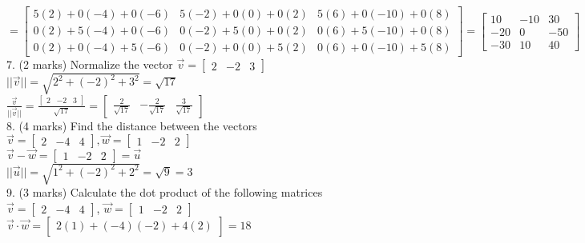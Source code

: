 \documentclass[a4paper]{article}
\begin{document}
$=\begin{bmatrix}
5(2)+0(-4)+0(-6)&5(-2)+0(0)+0(2)&5(6)+0(-10)+0(8)\\
0(2)+5(-4)+0(-6)&0(-2)+5(0)+0(2)&0(6)+5(-10)+0(8)\\
0(2)+0(-4)+5(-6)&0(-2)+0(0)+5(2)&0(6)+0(-10)+5(8)
\end{bmatrix} = \begin{bmatrix}
10&-10&30\\
-20&0&-50\\
-30&10&40
\end{bmatrix}$\\

7. (2 marks) Normalize the vector $\vec{v} = \begin{bmatrix}
2&-2&3
\end{bmatrix}$\\
$||\vec{v}|| = \sqrt{2^2+(-2)^2+3^2} = \sqrt{17}$\\
$\frac{\vec{v}}{||\vec{v}||} = \frac{\begin{bmatrix}
2&-2&3
\end{bmatrix}}{\sqrt{17}} =  \begin{bmatrix}
\frac{2}{\sqrt{17}}&-\frac{2}{\sqrt{17}}&\frac{3}{\sqrt{17}}
\end{bmatrix}$\\

8. (4 marks) Find the distance between the vectors $\vec{v} = \begin{bmatrix}
2&-4&4
\end{bmatrix}, \vec{w} = \begin{bmatrix}
1&-2&2
\end{bmatrix}$\\
$\vec{v}-\vec{w} = \begin{bmatrix}
1&-2&2
\end{bmatrix} = \vec{u}$\\
$||\vec{u}|| = \sqrt{1^2+(-2)^2+2^2} = \sqrt{9} = 3$\\

9. (3 marks) Calculate the dot product of the following matrices $\vec{v} = \begin{bmatrix}
2&-4&4
\end{bmatrix}$, $\vec{w} = \begin{bmatrix}
1&-2&2
\end{bmatrix}$\\
$\vec{v} \cdot \vec{w} = \begin{bmatrix}
2(1)+(-4)(-2)+4(2)
\end{bmatrix} = 18$\\
\end{document}

